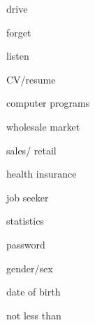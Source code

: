 \documentclass[avery5371,grid,frame]{flashcards}
\begin{document}
\begin{flashcard}{\LARGE drive}
\LARGE {}
\end{flashcard}
\begin{flashcard}{\LARGE forget}
\LARGE {}
\end{flashcard}
\begin{flashcard}{\LARGE listen}
\LARGE {}
\end{flashcard}
\begin{flashcard}{\LARGE CV/resume}
\LARGE {}
\end{flashcard}
\begin{flashcard}{\LARGE computer programs}
\LARGE {}
\end{flashcard}
\begin{flashcard}{\LARGE wholesale market}
\LARGE {}
\end{flashcard}
\begin{flashcard}{\LARGE sales/ retail}
\LARGE {}
\end{flashcard}
\begin{flashcard}{\LARGE health insurance}
\LARGE {}
\end{flashcard}
\begin{flashcard}{\LARGE job seeker}
\LARGE {}
\end{flashcard}
\begin{flashcard}{\LARGE statistics}
\LARGE {}
\end{flashcard}
\begin{flashcard}{\LARGE password}
\LARGE {}
\end{flashcard}
\begin{flashcard}{\LARGE gender/sex}
\LARGE {}
\end{flashcard}
\begin{flashcard}{\LARGE date of birth}
\LARGE {}
\end{flashcard}
\begin{flashcard}{\LARGE not less than}
\LARGE {}
\end{flashcard}
\end{document}
